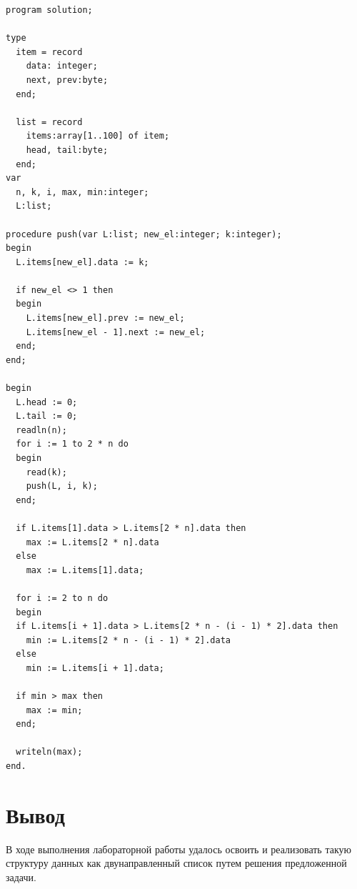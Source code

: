 \documentclass[a4paper,14pt]{extarticle}
\begin{document}
  \begin{Verbatim}[tabsize=2]
program solution;

type
  item = record
    data: integer;
    next, prev:byte;
  end;

  list = record
    items:array[1..100] of item;
    head, tail:byte;
  end;
var
  n, k, i, max, min:integer;
  L:list;

procedure push(var L:list; new_el:integer; k:integer);
begin
  L.items[new_el].data := k;
  
  if new_el <> 1 then
  begin
    L.items[new_el].prev := new_el;
    L.items[new_el - 1].next := new_el;
  end;
end;

begin
  L.head := 0;
  L.tail := 0;
  readln(n);
  for i := 1 to 2 * n do
  begin
    read(k);
    push(L, i, k);
  end;
  
  if L.items[1].data > L.items[2 * n].data then
    max := L.items[2 * n].data
  else
    max := L.items[1].data;
  
  for i := 2 to n do
  begin
  if L.items[i + 1].data > L.items[2 * n - (i - 1) * 2].data then
    min := L.items[2 * n - (i - 1) * 2].data
  else
    min := L.items[i + 1].data;
  
  if min > max then
    max := min;
  end;
  
  writeln(max);
end.
  \end{Verbatim}

  \section*{Вывод}
  В ходе выполнения лабораторной работы удалось освоить и реализовать такую структуру данных как двунаправленный список путем решения предложенной задачи.
\end{document}
